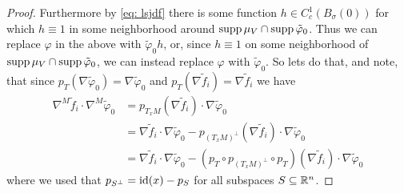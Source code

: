 \begin{proof}
Furthermore by \eqref{eq: lsjdf} there is some function $h \in C_c^1(B_{\sigma}(0))$ for which $h \equiv 1$ in some neighborhood around $\operatorname{supp} \mu_V \cap \operatorname{supp} \tilde \varphi_0$. Thus we can replace $\varphi$ in the above with $\tilde \varphi_0 h$, or, since $h \equiv 1$ on some neighborhood of $\operatorname{supp} \mu_V \cap \operatorname{supp} \tilde \varphi_0$, we can instead replace $\varphi$ with $\tilde \varphi_0$. So lets do that, and note, that since $p_T(\nabla\tilde\varphi_0) = \nabla\tilde\varphi_0$ and $p_T(\nabla\tilde f_i) = \nabla\tilde f_i$ we have
\begin{align}
    \nabla^M\tilde f_i \cdot \nabla^M\tilde \varphi_0 &= p_{T_xM}(\nabla\tilde f_i) \cdot \nabla \tilde \varphi_0 \nonumber \\
    &= \nabla\tilde f_i \cdot \nabla\tilde\varphi_0 - p_{(T_xM)^{\perp}} (\nabla\tilde f_i)\cdot \nabla\tilde\varphi_0 \nonumber\\
    &= \nabla\tilde f_i \cdot \nabla\tilde\varphi_0 - ( p_T \circ p_{(T_xM)^{\perp}} \circ p_T) (\nabla\tilde f_i)\cdot \nabla\tilde\varphi_0\label{eq: te10}
\end{align}
where we used that $p_{S^{\perp}}=\operatorname{id}(x) - p_S$ for all subspaces $S \subseteq \mathbb{R}^n$.


\end{proof}
